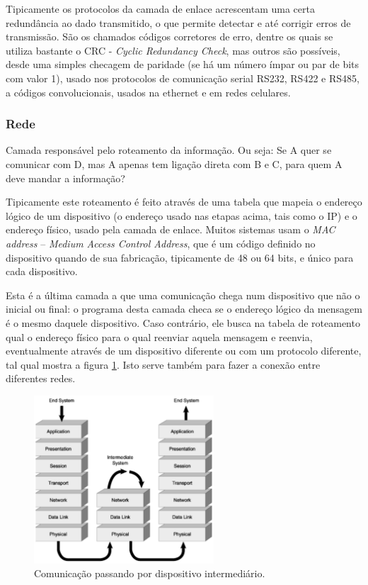 Tipicamente os protocolos da camada de enlace acrescentam uma certa redundância ao dado transmitido, o que permite detectar e até corrigir erros de transmissão. São os chamados códigos corretores de erro, dentre os quais se utiliza bastante o CRC - \emph{Cyclic Redundancy Check}, mas outros são possíveis, desde uma simples checagem de paridade (se há um número ímpar ou par de bits com valor 1), usado nos protocolos de comunicação serial RS232, RS422 e RS485, a códigos convolucionais, usados na ethernet e em redes celulares.

\subsubsection{Rede}
Camada responsável pelo roteamento da informação. Ou seja: Se A quer se comunicar com D, mas A apenas tem ligação direta com B e C, para quem A deve mandar a informação?

Tipicamente este roteamento é feito através de uma tabela que mapeia o endereço lógico de um dispositivo (o endereço usado nas etapas acima, tais como o IP) e o endereço físico, usado pela camada de enlace. Muitos sistemas usam o \emph{MAC address} -- \emph{Medium Access Control Address}, que é um código definido no dispositivo quando de sua fabricação, tipicamente de 48 ou 64 bits, e único para cada dispositivo.

Esta é a última camada a que uma comunicação chega num dispositivo que não o inicial ou final: o programa desta camada checa se o endereço lógico da mensagem é o mesmo daquele dispositivo. Caso contrário, ele busca na tabela de roteamento qual o endereço físico para o qual reenviar aquela mensagem e reenvia, eventualmente através de um dispositivo diferente ou com um protocolo diferente, tal qual mostra a figura \ref{fig:camada_rede}. Isto serve também para fazer a conexão entre diferentes redes.

\begin{figure}[hbt]
	\begin{center}
		\includegraphics[width=0.6\textwidth]{figuras/network_layer}
	\end{center}
	\caption{Comunicação passando por dispositivo intermediário.}
	\label{fig:camada_rede}
\end{figure}

